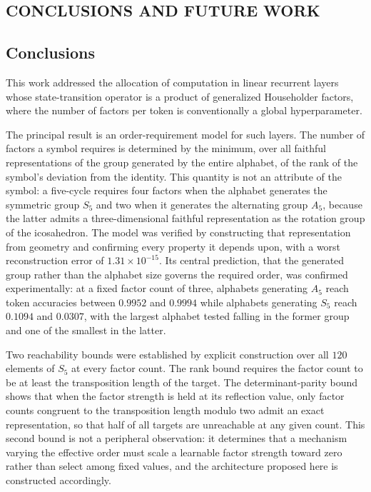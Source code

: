 \begin{center}
	\chapter{CONCLUSIONS AND FUTURE WORK}
\end{center}
\justifying

\section{Conclusions}

This work addressed the allocation of computation in linear recurrent layers
whose state-transition operator is a product of generalized Householder factors,
where the number of factors per token is conventionally a global hyperparameter.

The principal result is an order-requirement model for such layers. The number of
factors a symbol requires is determined by the minimum, over all faithful
representations of the group generated by the entire alphabet, of the rank of the
symbol's deviation from the identity. This quantity is not an attribute of the
symbol: a five-cycle requires four factors when the alphabet generates the
symmetric group $S_5$ and two when it generates the alternating group $A_5$,
because the latter admits a three-dimensional faithful representation as the
rotation group of the icosahedron. The model was verified by constructing that
representation from geometry and confirming every property it depends upon, with
a worst reconstruction error of $1.31 \times 10^{-15}$. Its central prediction,
that the generated group rather than the alphabet size governs the required
order, was confirmed experimentally: at a fixed factor count of three, alphabets
generating $A_5$ reach token accuracies between $0.9952$ and $0.9994$ while
alphabets generating $S_5$ reach $0.1094$ and $0.0307$, with the largest alphabet
tested falling in the former group and one of the smallest in the latter.

Two reachability bounds were established by explicit construction over all $120$
elements of $S_5$ at every factor count. The rank bound requires the factor count
to be at least the transposition length of the target. The determinant-parity
bound shows that when the factor strength is held at its reflection value, only
factor counts congruent to the transposition length modulo two admit an exact
representation, so that half of all targets are unreachable at any given count.
This second bound is not a peripheral observation: it determines that a mechanism
varying the effective order must scale a learnable factor strength toward zero
rather than select among fixed values, and the architecture proposed here is
constructed accordingly.

